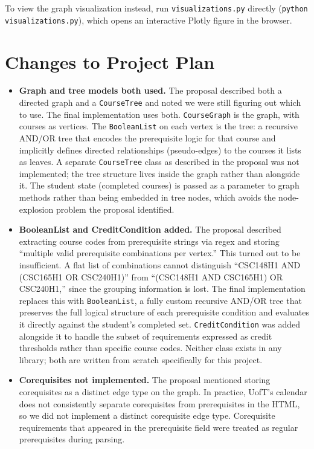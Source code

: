 \documentclass[11pt]{article}
\begin{document}
To view the graph visualization instead, run \verb|visualizations.py| directly
(\verb|python visualizations.py|), which opens an interactive Plotly figure in the browser.

\section*{Changes to Project Plan}

\begin{itemize}

    \item \textbf{Graph and tree models both used.} The proposal described both a directed
    graph and a \verb|CourseTree| and noted we were still figuring out which to use. The
    final implementation uses both. \verb|CourseGraph| is the graph, with courses as vertices.
    The \verb|BooleanList| on each vertex is the tree: a recursive AND/OR tree that encodes
    the prerequisite logic for that course and implicitly defines directed relationships
    (pseudo-edges) to the courses it lists as leaves. A separate \verb|CourseTree| class as
    described in the proposal was not implemented; the tree structure lives inside the
    graph rather than alongside it. The student state (completed courses) is passed as a
    parameter to graph methods rather than being embedded in tree nodes, which avoids the
    node-explosion problem the proposal identified.

    \item \textbf{BooleanList and CreditCondition added.} The proposal described extracting
    course codes from prerequisite strings via regex and storing ``multiple valid prerequisite
    combinations per vertex.'' This turned out to be insufficient. A flat list of combinations
    cannot distinguish ``CSC148H1 AND (CSC165H1 OR CSC240H1)'' from
    ``(CSC148H1 AND CSC165H1) OR CSC240H1,'' since the grouping information is lost. The
    final implementation replaces this with \verb|BooleanList|, a fully custom recursive
    AND/OR tree that preserves the full logical structure of each prerequisite condition and
    evaluates it directly against the student's completed set. \verb|CreditCondition| was
    added alongside it to handle the subset of requirements expressed as credit thresholds
    rather than specific course codes. Neither class exists in any library; both are written
    from scratch specifically for this project.

    \item \textbf{Corequisites not implemented.} The proposal mentioned storing corequisites
    as a distinct edge type on the graph. In practice, UofT's calendar does not consistently
    separate corequisites from prerequisites in the HTML, so we did not implement a distinct
    corequisite edge type. Corequisite requirements that appeared in the prerequisite field
    were treated as regular prerequisites during parsing.


\end{itemize}
\end{document}
